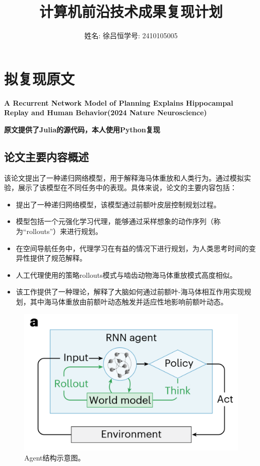 \documentclass[UTF8,12pt]{article} %
\newcommand*{\heiti}{\CJKfamily{zhhei}}   %
\begin{document}
\renewcommand{\figurename}{图}
\renewcommand{\tablename}{表}
\renewcommand{\refname}{参考文献}

\title{\bf{\heiti 计算机前沿技术成果复现计划}}
\author{\normalsize{姓名: 徐吕恒}\hspace{2cm}\normalsize{学号: 2410105005}}
\date{}
\maketitle


\section{拟复现原文}

\textbf{A Recurrent Network Model of Planning Explains Hippocampal Replay and Human Behavior(2024 Nature Neuroscience)}

\textbf{\textcolor[rgb]{1,0,0}{原文提供了Julia的源代码，本人使用Python复现}}

\subsection{论文主要内容概述}

该论文提出了一种递归网络模型，用于解释海马体重放和人类行为。通过模拟实验，展示了该模型在不同任务中的表现。具体来说，论文的主要内容包括：

\begin{itemize}
    \item 提出了一种递归网络模型，该模型通过前额叶皮层控制规划过程。
    \item 模型包括一个元强化学习代理，能够通过采样想象的动作序列（称为“rollouts”）来进行规划。
    \item 在空间导航任务中，代理学习在有益的情况下进行规划，为人类思考时间的变异性提供了规范解释。
    \item 人工代理使用的策略rollouts模式与啮齿动物海马体重放模式高度相似。
    \item 该工作提供了一种理论，解释了大脑如何通过前额叶-海马体相互作用实现规划，其中海马体重放由前额叶动态触发并适应性地影响前额叶动态。
\end{itemize}

\begin{figure}[ht]
  \centering
  \includegraphics[scale=0.2]{figs/fig2.png}
  \caption{Agent结构示意图。}
  \label{fig:Agent-model}
\end{figure}
\end{document}

